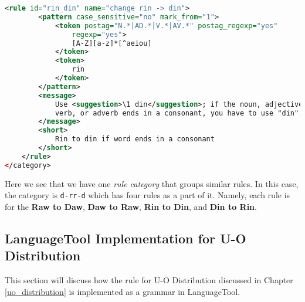 \begin{lstlisting}[language= XML, caption=Grammar for R-D Alternation]
    <rule id="rin_din" name="change rin -> din">
        <pattern case_sensitive="no" mark_from="1">
            <token postag="N.*|AD.*|V.*|AV.*" postag_regexp="yes" 
                regexp="yes">
                [A-Z][a-z]*[^aeiou]
            </token>
            <token>
                rin
            </token>
        </pattern>
        <message>
            Use <suggestion>\1 din</suggestion>; if the noun, adjective, 
            verb, or adverb ends in a consonant, you have to use "din".
        </message>
        <short>
            Rin to din if word ends in a consonant
        </short>
    </rule>
</category>
\end{lstlisting}

Here we see that we have one \textit{rule category} that groups similar rules. In this case, the category is \texttt{d-r\textunderscore r-d} which has four rules as a part of it. Namely, each rule is for the \textbf{Raw to Daw}, \textbf{Daw to Raw}, \textbf{Rin to Din}, and \textbf{Din to Rin}.

\subsection{LanguageTool Implementation for U-O Distribution}

This section will discuss how the rule for U-O Distribution discussed in Chapter \ref{uo_distribution} is implemented as a grammar in LanguageTool.

